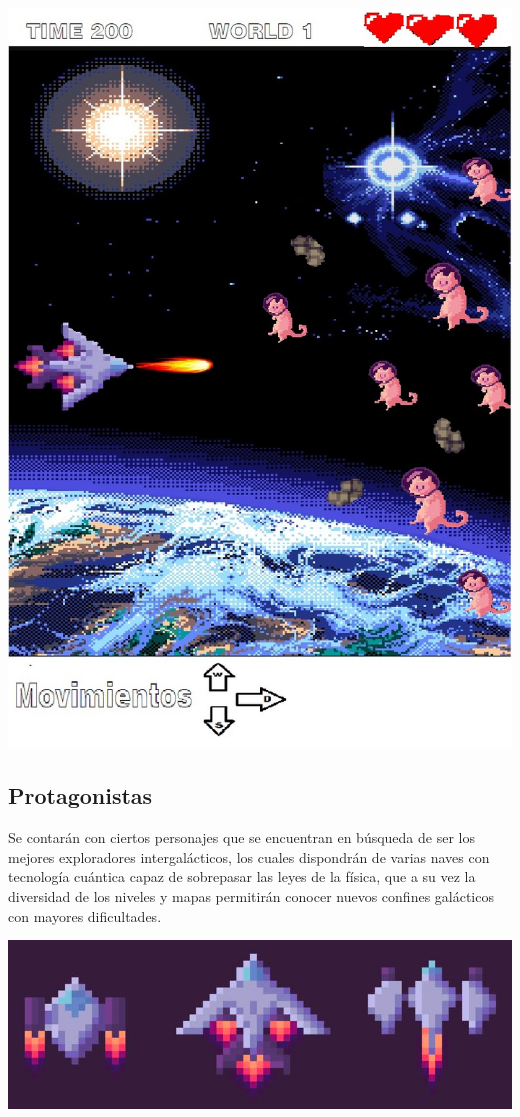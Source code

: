\documentclass{article}
\begin{document}
\includegraphics[scale=0.35]{Ideación/Images/movimientos.jpeg}


\subsection{Protagonistas}
Se contarán con ciertos personajes que se encuentran en búsqueda de ser los mejores exploradores intergalácticos, los cuales dispondrán de varias naves con tecnología cuántica capaz de sobrepasar las leyes de la física, que a su vez la diversidad de los niveles y mapas permitirán conocer nuevos confines galácticos con mayores dificultades. 

\includegraphics[scale=0.48]{Ideación/Images/protagonistas.png}
\end{document}

